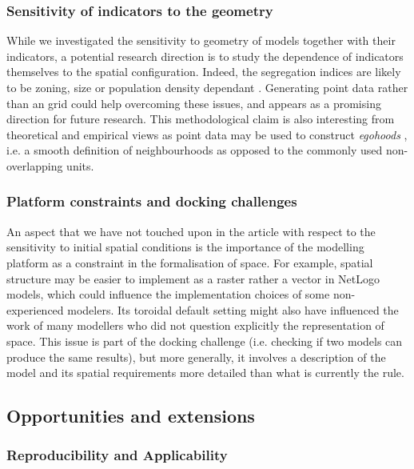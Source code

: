 \documentclass{JASSS}
\begin{document}
\subsubsection{Sensitivity of indicators to the geometry}

While we investigated the sensitivity to geometry of models together with their indicators, a potential research direction is to study the dependence of indicators themselves to the spatial configuration. Indeed, the segregation indices are likely to be zoning, size or population density dependant \citep{Wong1997,ReardonOSullivan2004}. Generating point data rather than an grid could help overcoming these issues, and appears as a promising direction for future research. This methodological claim is also interesting from theoretical and empirical views as point data may be used to construct \textit{egohoods} \citep{Hippetal2013}, i.e. a smooth definition of neighbourhoods as opposed to the commonly used non-overlapping units. 

\subsubsection{Platform constraints and docking challenges}

An aspect that we have not touched upon in the article with respect to the sensitivity to initial spatial conditions is the importance of the modelling platform as a constraint in the formalisation of space. For example, spatial structure may be easier to implement as a raster rather a vector in NetLogo models, which could influence the implementation choices of some non-experienced modelers. Its toroidal default setting might also have influenced the work of many modellers who did not question explicitly the representation of space. This issue is part of the docking challenge \citep{Axtelletal1996} (i.e. checking if two models can produce the same results), but more generally, it involves a description of the model and its spatial requirements more detailed than what is currently the rule.



\subsection{Opportunities and extensions}


\subsubsection{Reproducibility and Applicability} 
\end{document}
